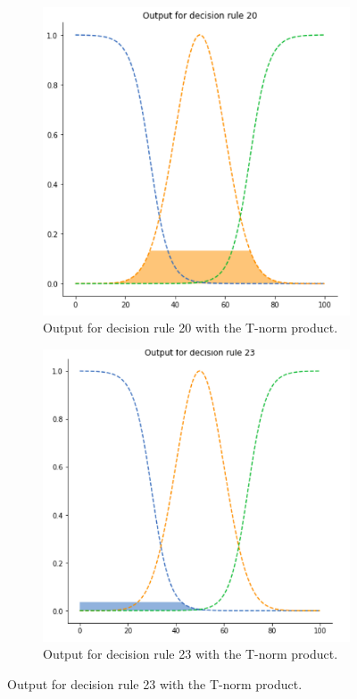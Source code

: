 \documentclass[conference]{IEEEtran}
\begin{document}
\begin{figure}[ht]
\begin{subfigure}{.5\textwidth}
  \centering
  \includegraphics[width=.8\linewidth]{figures/third/prod1.png}  
  \caption{Output for decision rule 20 with the T-norm product.}
  \label{fig:3prod1}
\end{subfigure}
\begin{subfigure}{.5\textwidth}
  \centering
  \includegraphics[width=.8\linewidth]{figures/third/prod2.png}  
  \caption{Output for decision rule 23 with the T-norm product.}
  \label{fig:3prod2}
\end{subfigure}

\end{figure}
\end{document}
